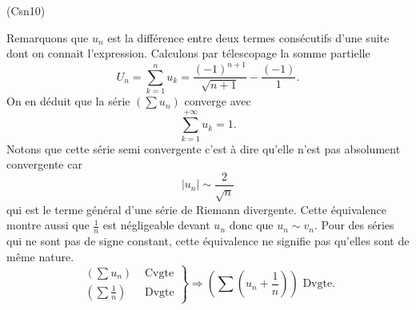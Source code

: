 \begin{tiny}(Csn10)\end{tiny} Remarquons que $u_n$ est la différence entre deux termes consécutifs d'une suite dont on connait l'expression. Calculons par télescopage la somme partielle
\[
  U_n =
  \sum_{k=1}^{n}u_k
  = \frac{(-1)^{n+1}}{\sqrt{n+1}} -\frac{(-1)}{1}.
\]
On en déduit que la série $\left( \sum u_n \right)$ converge avec 
\[
  \sum_{k=1}^{+\infty} u_k = 1.
\]
Notons que cette série semi convergente c'est à dire qu'elle n'est pas absolument convergente car
\[
  |u_n| \sim \frac{2}{\sqrt{n}}
\]
qui est le terme général d'une série de Riemann divergente. Cette équivalence montre aussi que $\frac{1}{n}$ est négligeable devant $u_n$ donc que $u_n \sim v_n$.\newline
Pour des séries qui ne sont pas de signe constant, cette équivalence ne signifie pas qu'elles sont de même nature.
\[
  \left.
  \begin{aligned}
  \left( \sum u_n \right) &\text{ Cvgte} \\    
  \left( \sum \frac{1}{n} \right) &\text{ Dvgte}
  \end{aligned}
\right\rbrace
\Rightarrow
\left( \sum (u_n + \frac{1}{n}) \right) \text{ Dvgte}.
\]
